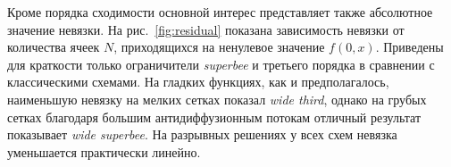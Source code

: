 \documentclass[a4paper,10pt]{article}
\begin{document}
Кроме порядка сходимости основной интерес представляет также абсолютное значение невязки.
На рис.~\ref{fig:residual} показана зависимость невязки от количества ячеек \(N\), приходящихся на ненулевое значение \(f(0,x)\).
Приведены для краткости только ограничители \textit{superbee} и третьего порядка в сравнении с классическими схемами.
На гладких функциях, как и предполагалось, наименьшую невязку на мелких сетках показал \textit{wide third},
однако на грубых сетках благодаря большим антидиффузионным потокам отличный результат показывает \textit{wide superbee}.
На разрывных решениях у всех схем невязка уменьшается практически линейно.

\begin{figure}[h]
		\\

\end{figure}
\end{document}
